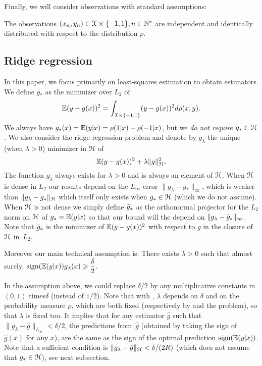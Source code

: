 \documentclass[final]{colt2018} %
\begin{document}
Finally, we will consider observations with standard assumptions:

\bas\label{asm:data-iid}
The observations $(x_n,y_n) \in {\mathcal X} \times \{-1,1\}, n \in \mathbb N^*$ are independent and identically distributed with respect to the distribution $\rho$.
\eas

\subsection{Ridge regression}
In this paper, we focus primarily on least-squares estimation to obtain estimators. We define $g_\ast$ as the minimizer over $L_2$ of 
$$ {\mathbb E}  ( y - g(x) )^2 = \int_{{\mathcal X} \times \{-1,1\}} ( y - g(x) )^2 d\rho(x,y) .$$
We always have $g_\ast(x) = {\mathbb E}(y|x) = \rho(1|x) - \rho(-1|x)$, but we
\emph{do not require} $g_\ast \in {\mathcal H}$. We also consider the ridge regression problem \citep{caponnetto2007optimal} and denote by $g_\lambda$  the unique (when $\lambda > 0$) minimizer in ${\mathcal H}$ of 
$$ {\mathbb E}  ( y - g(x) )^2  + \lambda \| g\|_{\mathcal H}^2  .$$
%
The function $g_\lambda$ always exists for $\lambda >0$ and is always an element of ${\mathcal H}$. 
%
%
When ${\mathcal H}$ is dense in $L_2$ our results depend on the $L_\infty$-error $\|g_\lambda - g_\ast\|_\infty$, which is weaker than $\|g_\lambda - g_\ast\|_{\mathcal H}$ which itself only exists when $g_\ast \in {\mathcal H}$ (which we do not assume).
%
When ${\mathcal H}$ is not dense we simply define $\tilde{g}_*$ as the orthonormal projector for the $L_2$ norm on ${\mathcal H}$ of $g_* = {\mathbb E}(y|x)$ so that our bound will the depend on $\|g_\lambda - \tilde{g}_*\|_\infty$. Note that $\tilde{g}_*$ is the minimizer of ${\mathbb E} (y - g(x))^2$ with respect to $g$ in the closure of ${\mathcal H}$ in~$L_2$.




Moreover our  main technical  assumption is: 
\bas\label{asm:flambda-correct-sign} 
There exists $\lambda>0$ such that almost surely, 
$ \displaystyle \mathop{ \mathrm{sign}}( {\mathbb E}(y|x) ) g_\lambda(x) \geqslant \frac{\delta}{2}$. 
\eas

In the assumption above, we could replace $\delta/2$ by any multiplicative constants in $(0,1)$ times$\delta$ (instead of $1/2$). Note that with , $\lambda$ depends on $\delta$ and on the probability measure $\rho$, which are both fixed (respectively by  and the problem), so that $\lambda$ is fixed too. It implies that for any estimator $\hat{g}$ such that 
$\| g_\lambda - \hat{g}\|_{L_\infty} < \delta / 2
$, the predictions from~$\hat{g}$ (obtained by taking the sign of $\hat{g}(x)$ for any $x$), are the same as the sign of the optimal prediction $\mathop{ \mathrm{sign}}({\mathbb E}(y|x))$. Note that a  sufficient condition is $\| g_\lambda - \hat{g}\|_{{\mathcal H}} < \delta/(2R)$ (which does not assume that $g_\ast \in {\mathcal H}$), see next subsection. 
\end{document}

